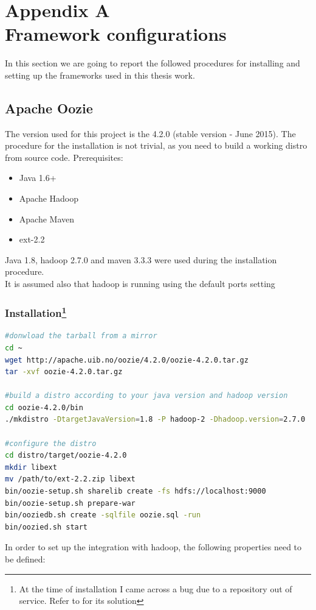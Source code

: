 \chapter*{Appendix A\\ Framework configurations}
\label{appendix}
In this section we are going to report the followed procedures for installing and setting up the frameworks used in this thesis work.
\section{Apache Oozie}

The version used for this project is the 4.2.0 (stable version - June 2015). The procedure for the installation is not trivial, as you need to build a working distro from source code.
Prerequisites:
\begin{itemize}
\item Java 1.6+
\item Apache Hadoop
\item Apache Maven
\item ext-2.2
\end{itemize}
Java 1.8, hadoop 2.7.0 and maven 3.3.3 were used during the installation procedure.\\
It is assumed also that hadoop is running using the default ports setting
\subsection{Installation\protect\footnote{At the time of installation I came across a bug due to a repository out of service. Refer to \cite{bib3} for its solution}}
\begin{lstlisting}[language=sh]
#donwload the tarball from a mirror
cd ~
wget http://apache.uib.no/oozie/4.2.0/oozie-4.2.0.tar.gz 
tar -xvf oozie-4.2.0.tar.gz

#build a distro according to your java version and hadoop version
cd oozie-4.2.0/bin
./mkdistro -DtargetJavaVersion=1.8 -P hadoop-2 -Dhadoop.version=2.7.0 

#configure the distro
cd distro/target/oozie-4.2.0
mkdir libext
mv /path/to/ext-2.2.zip libext
bin/oozie-setup.sh sharelib create -fs hdfs://localhost:9000
bin/oozie-setup.sh prepare-war
bin/ooziedb.sh create -sqlfile oozie.sql -run
bin/oozied.sh start
\end{lstlisting}

In order to set up the integration with hadoop, the following properties need to be defined:

